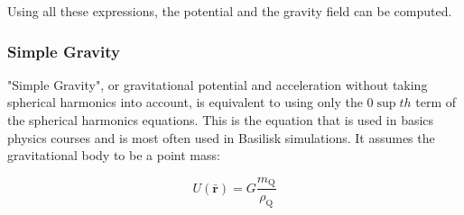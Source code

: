 Using all these expressions, the potential and the gravity field can be computed.

\subsubsection{Simple Gravity}
"Simple Gravity", or gravitational potential and acceleration without taking spherical harmonics into account, is equivalent to using only the $0\sup{th}$ term of the spherical harmonics equations. This is the equation that is used in basics physics courses and is most often used in Basilisk simulations. It assumes the gravitational body to be a point mass:

\begin{equation}
U(\mathbf{\bar r}) = G \frac{ m_\text{Q}}{\rho_\text{Q}}
\end{equation}
